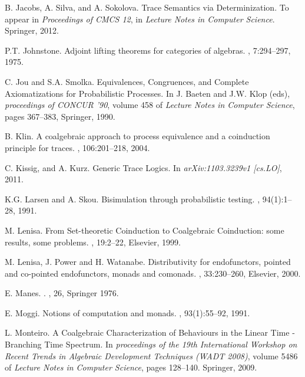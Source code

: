 \documentclass{LMCS}
\begin{document}
\begin{thebibliography}{10}
B. Jacobs, A. Silva, and A. Sokolova.
\newblock Trace Semantics via Determinization.
\newblock To appear in {\em Proceedings of CMCS 12}, in {\em Lecture Notes in Computer Science}. Springer, 2012. 

P.T. Johnstone.
\newblock Adjoint lifting theorems for categories of algebras.
, 7:294--297, 1975.

C. Jou and S.A. Smolka.
\newblock Equivalences, Congruences, and Complete Axiomatizations for Probabilistic Processes.
\newblock In J. Baeten and J.W. Klop (eds), {\em  proceedings of CONCUR '90}, volume 458 of
  {\em Lecture Notes in Computer Science}, pages 367--383, Springer, 1990.

B. Klin.
\newblock A coalgebraic approach to process equivalence and a coinduction principle for traces.
\newblock {}, 106:201--218, 2004.

C. Kissig, and A. Kurz. 
\newblock Generic Trace Logics.
\newblock In {\em arXiv:1103.3239v1 [cs.LO]}, 2011.

K.G. Larsen and A. Skou.
\newblock Bisimulation through probabilistic testing.
, 94(1):1--28, 1991.

M. Lenisa.
\newblock From Set-theoretic Coinduction to Coalgebraic Coinduction: some results, some problems.
, 19:2--22, Elsevier, 1999.

M. Lenisa, J. Power and H. Watanabe.
\newblock Distributivity for endofunctors, pointed and co-pointed endofunctors, monads and comonads.
, 33:230--260, Elsevier, 2000.



E. Manes.
.
, 26, Springer 1976.

E. Moggi.
\newblock Notions of computation and monads.
, 93(1):55--92, 1991.

L. Monteiro.
\newblock A Coalgebraic Characterization of Behaviours in the Linear Time - Branching Time Spectrum.
\newblock In {\em proceedings of the 19th International Workshop on Recent Trends in Algebraic
  Development Techniques (WADT 2008)}, volume 5486 of {\em Lecture Notes in Computer Science},
  pages 128--140. Springer, 2009.


\end{thebibliography}
\end{document}
